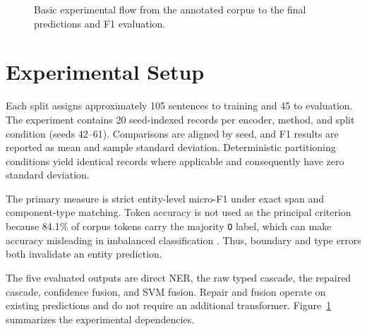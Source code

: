\documentclass[conference,a4paper]{IEEEtran}
\begin{document}
\begin{figure}[!t]
\centering
{}
\caption{Basic experimental flow from the annotated corpus to the final predictions and F1 evaluation.}
\label{fig:process}
\end{figure}

\section{Experimental Setup}

Each split assigns approximately 105 sentences to training and 45 to evaluation. The experiment contains 20 seed-indexed records per encoder, method, and split condition (seeds 42--61). Comparisons are aligned by seed, and F1 results are reported as mean and sample standard deviation. Deterministic partitioning conditions yield identical records where applicable and consequently have zero standard deviation.

The primary measure is strict entity-level micro-F1 under exact span and component-type matching. Token accuracy is not used as the principal criterion because 84.1\% of corpus tokens carry the majority \texttt{O} label, which can make accuracy misleading in imbalanced classification \cite{sokolova2009measures}. Thus, boundary and type errors both invalidate an entity prediction.

The five evaluated outputs are direct NER, the raw typed cascade, the repaired cascade, confidence fusion, and SVM fusion. Repair and fusion operate on existing predictions and do not require an additional transformer. Figure~\ref{fig:process} summarizes the experimental dependencies.
\end{document}
